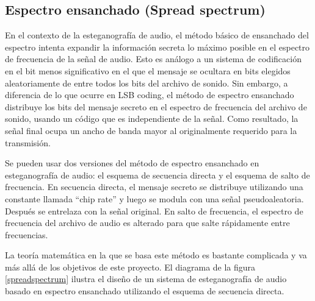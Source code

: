 \documentclass[12pt]{article}
\begin{document}
\subsection{Espectro ensanchado (Spread spectrum)}

En el contexto de la esteganografía de audio, el método básico de ensanchado del espectro intenta expandir la información secreta lo máximo posible en el espectro de frecuencia de la señal de audio. Esto es análogo a un sistema de codificación en el bit menos significativo en el que el mensaje se ocultara en bits elegidos aleatoriamente de entre todos los bits del archivo de sonido. Sin embargo, a diferencia de lo que ocurre en LSB coding, el método de espectro ensanchado distribuye los bits del mensaje secreto en el espectro de frecuencia del archivo de sonido, usando un código que es independiente de la señal. Como resultado, la señal final ocupa un ancho de banda mayor al originalmente requerido para la transmisión.

Se pueden usar dos versiones del método de espectro ensanchado en esteganografía de audio: el esquema de secuencia directa y el esquema de salto de frecuencia. En secuencia directa, el mensaje secreto se distribuye utilizando una constante llamada ``chip rate'' y luego se modula con una señal pseudoaleatoria. Después se entrelaza con la señal original. En salto de frecuencia, el espectro de frecuencia del archivo de audio es alterado para que salte rápidamente entre frecuencias.

La teoría matemática en la que se basa este método es bastante complicada y va más allá de los objetivos de este proyecto. El diagrama de la figura \ref{spreadspectrum} ilustra el diseño de un sistema de esteganografía de audio basado en espectro ensanchado utilizando el esquema de secuencia directa.
\end{document}
